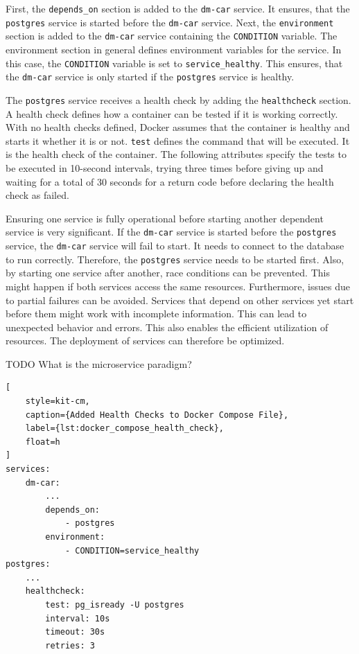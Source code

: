 First, the \texttt{depends\_on} section is added to the \texttt{dm-car} service.
It ensures, that the \texttt{postgres} service is started before the \texttt{dm-car} service.
Next, the \texttt{environment} section is added to the \texttt{dm-car} service containing the \texttt{CONDITION} variable.
The environment section in general defines environment variables for the service.
In this case, the \texttt{CONDITION} variable is set to \texttt{service\_healthy}.
This ensures, that the \texttt{dm-car} service is only started if the \texttt{postgres} service is healthy.

The \texttt{postgres} service receives a health check by adding the \texttt{healthcheck} section.
A health check defines how a container can be tested if it is working correctly.
With no health checks defined, Docker assumes that the container is healthy and starts it whether it is or not.
\texttt{test} defines the command that will be executed.
It is the health check of the container.
The following attributes specify the tests to be executed in 10-second intervals, trying three times before giving up and waiting for a total of 30 seconds for a return code before declaring the health check as failed.

Ensuring one service is fully operational before starting another dependent service is very significant.
If the \texttt{dm-car} service is started before the \texttt{postgres} service, the \texttt{dm-car} service will fail to start.
It needs to connect to the database to run correctly.
Therefore, the \texttt{postgres} service needs to be started first.
Also, by starting one service after another, race conditions can be prevented.
This might happen if both services access the same resources.
Furthermore, issues due to partial failures can be avoided.
Services that depend on other services yet start before them might work with incomplete information.
This can lead to unexpected behavior and errors.
This also enables the efficient utilization of resources.
The deployment of services can therefore be optimized.

TODO What is the microservice paradigm?

\begin{lstlisting}[
    style=kit-cm,
    caption={Added Health Checks to Docker Compose File},
    label={lst:docker_compose_health_check},
    float=h
]
services:
    dm-car:
        ...
        depends_on:
            - postgres
        environment:
            - CONDITION=service_healthy
postgres:
    ...
    healthcheck:
        test: pg_isready -U postgres
        interval: 10s
        timeout: 30s
        retries: 3
\end{lstlisting}

